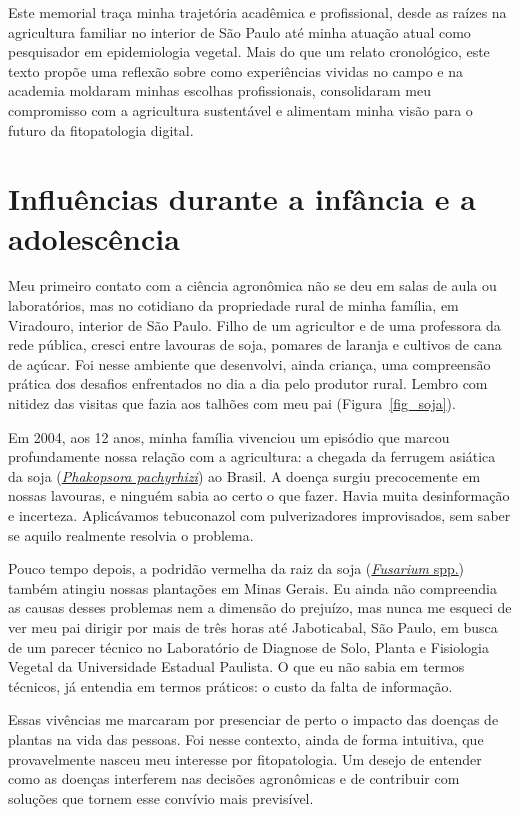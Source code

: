 \documentclass[12pt,a4paper,oneside]{book}
\begin{document}
Este memorial traça minha trajetória acadêmica e profissional, desde as raízes na agricultura familiar no interior
de São Paulo até minha atuação atual como pesquisador em epidemiologia vegetal. Mais do que um relato cronológico,
este texto propõe uma reflexão sobre como experiências vividas no campo e na academia moldaram minhas escolhas 
profissionais, consolidaram meu compromisso com a agricultura sustentável e alimentam minha visão para o futuro 
da fitopatologia digital.

\section{Influências durante a infância e a adolescência}

Meu primeiro contato com a ciência agronômica não se deu em salas de aula ou laboratórios, mas no cotidiano da 
propriedade rural de minha família, em Viradouro, interior de São Paulo. Filho de um agricultor e de 
uma professora da rede pública, cresci entre lavouras de soja, pomares de laranja e cultivos de cana de 
açúcar. Foi nesse ambiente que desenvolvi, ainda criança, uma compreensão prática dos desafios enfrentados 
no dia a dia pelo produtor rural. Lembro com nitidez das visitas que fazia aos talhões com meu pai (Figura~\ref{fig_soja}).

Em 2004, aos 12 anos, minha família vivenciou um episódio que marcou profundamente nossa relação com a 
agricultura: a chegada da ferrugem asiática da soja
(\href{https://en.wikipedia.org/wiki/Soybean_rust}{\textit{Phakopsora pachyrhizi}}) ao Brasil. A doença 
surgiu precocemente em nossas lavouras, e ninguém sabia ao certo o que fazer. Havia muita desinformação 
e incerteza. Aplicávamos tebuconazol com pulverizadores improvisados, sem saber se aquilo realmente resolvia o problema.

Pouco tempo depois, a podridão vermelha da raiz da soja
(\href{https://en.wikipedia.org/wiki/Sudden_death_syndrome}{\textit{Fusarium} spp.}) também atingiu 
nossas plantações em Minas Gerais. Eu ainda não compreendia as causas desses problemas nem a dimensão do prejuízo, 
mas nunca me esqueci de ver meu pai dirigir por mais de três horas até Jaboticabal, São Paulo, em busca de 
um parecer técnico no Laboratório de Diagnose de Solo, Planta e Fisiologia Vegetal da Universidade Estadual 
Paulista. O que eu não sabia em termos técnicos, já entendia em termos práticos: o custo da falta de informação.

Essas vivências me marcaram por presenciar de perto o impacto das doenças de plantas na vida das pessoas. Foi 
nesse contexto, ainda de forma intuitiva, que provavelmente nasceu meu interesse por fitopatologia. 
Um desejo de entender como as doenças interferem nas decisões agronômicas e de contribuir com soluções 
que tornem esse convívio mais previsível.
\end{document}
